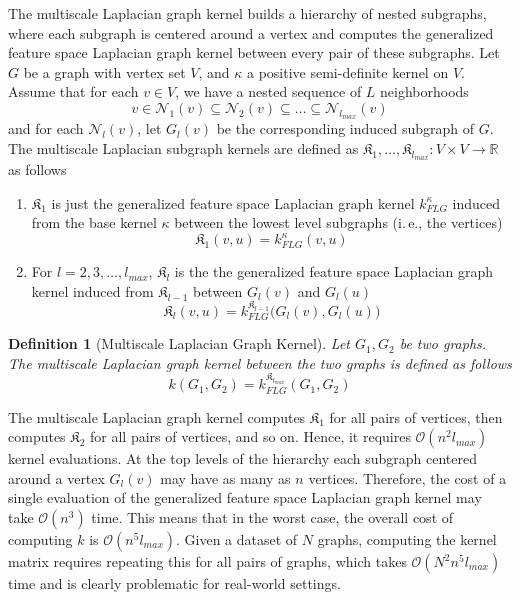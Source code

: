 \documentclass[twoside,11pt]{article}
\newcommand{\ie}{i.\,e., }
\newtheorem{definition}{Definition}
\begin{document}
The multiscale Laplacian graph kernel builds a hierarchy of nested subgraphs, where each subgraph is centered around a vertex and computes the generalized feature space Laplacian graph kernel between every pair of these subgraphs.
Let $G$ be a graph with vertex set $V$, and $\kappa$ a positive semi-definite kernel on $V$.
Assume that for each $v \in V$, we have a nested sequence of $L$ neighborhoods
\begin{equation}
    v \in \mathcal{N}_1(v) \subseteq \mathcal{N}_2(v) \subseteq \ldots \subseteq \mathcal{N}_{l_{max}}(v)
\end{equation}
and for each $\mathcal{N}_l(v)$, let $G_l(v)$ be the corresponding induced subgraph of $G$.
The multiscale Laplacian subgraph kernels are defined as $\mathfrak{K}_1, \ldots, \mathfrak{K}_{l_{max}} : V \times V \rightarrow \mathbb{R}$ as follows
\begin{enumerate}
    \item $\mathfrak{K}_1$ is just the generalized feature space Laplacian graph kernel $k_{FLG}^\kappa$ induced from the base kernel $\kappa$ between the lowest level subgraphs (\ie the vertices)
    \begin{equation}
        \mathfrak{K}_1(v,u) = k_{FLG}^\kappa(v, u)
    \end{equation}
    \item For $l=2,3,\ldots,l_{max}$, $\mathfrak{K}_l$ is the the generalized feature space Laplacian graph kernel induced from $\mathfrak{K}_{l-1}$ between $G_l(v)$ and $G_l(u)$
    \begin{equation}
        \mathfrak{K}_l(v,u) = k_{FLG}^{\mathfrak{K}_{l-1}} \big( G_l(v), G_l(u) \big)
    \end{equation}
\end{enumerate}

\begin{definition}[Multiscale Laplacian Graph Kernel]
	Let $G_1, G_2$ be two graphs.
	The multiscale Laplacian graph kernel between the two graphs is defined as follows
	\begin{equation}
	    k(G_1, G_2) = k_{FLG}^{\mathfrak{K}_{l_{max}}}(G_1, G_2)
	\end{equation}
\end{definition}
The multiscale Laplacian graph kernel computes $\mathfrak{K}_1$ for all pairs of vertices, then computes $\mathfrak{K}_2$ for all pairs of vertices, and so on.
Hence, it requires $\mathcal{O}(n^2 l_{max})$ kernel evaluations.
At the top levels of the hierarchy each subgraph centered around a vertex $G_l(v)$ may have as many as $n$ vertices.
Therefore, the cost of a single evaluation of the generalized feature space Laplacian graph kernel may take $\mathcal{O}(n^3)$ time.
This means that in the worst case, the overall cost of computing $k$ is $\mathcal{O}(n^5 l_{max})$.
Given a dataset of $N$ graphs, computing the kernel matrix requires repeating this for all pairs of graphs, which takes $\mathcal{O}(N^2n^5l_{max})$ time and is clearly problematic for real-world settings.
\end{document}
